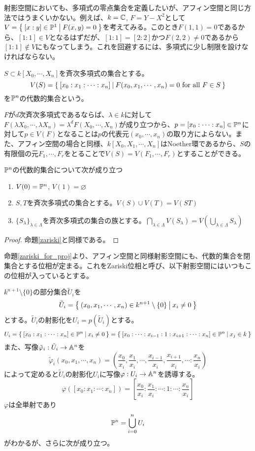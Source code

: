 \documentclass{ltjsreport}
\begin{document}
射影空間においても、多項式の零点集合を定義したいが、アフィン空間と同じ方法ではうまくいかない。例えば、$k=\mathbb{C}$, $F=Y-X^2$として$V=\left\{\:[x:y]\in\mathbb{P}^1\:\middle|\:F(x,y)=0\:\right\}$を考えてみる。このとき$F(1,1)=0$であるから、$[1:1]\in V$となるはずだが、$[1:1]=[2:2]$かつ$F(2,2)\neq 0$であるから$[1:1]\notin V$にもなってしまう。これを回避するには、多項式に少し制限を設けなければならない。

\begin{defin}
  $S\subset k[X_0,\cdots,X_n]$を斉次多項式の集合とする。
  \[
  V(S)=\left\{\:[x_0:x_1:\cdots:x_n]\:\middle|\:F(x_0,x_1,\cdots,x_n)=0\text{ for all }F\in S\:\right\}  
  \]
  を$\mathbb{P}^n$の代数的集合という。
\end{defin}

$F$が$d$次斉次多項式であるならば、$\lambda\in k$に対して$F(\lambda X_0,\cdots,\lambda X_n)=\lambda^dF(X_0,\cdots,X_n)$が成り立つから、$p=[x_0:\cdots:x_n]\in \mathbb{P}^n$に対して$p\in V(F)$となることは$p$の代表元$(x_0,\cdots,x_n)$の取り方によらない。また、アフィン空間の場合と同様、$k[X_0,X_1,\cdots,X_n]$はNoether環であるから、$S$の有限個の元$F_1,\cdots,F_r$をとることで$V(S)=V(F_1,\cdots,F_r)$とすることができる。

\begin{prop}\label{zariski_for_proj}
  $\mathbb{P}^n$の代数的集合について次が成り立つ
  \begin{enumerate}
    \item $V(0)=\mathbb{P}^n$, $V(1)=\varnothing$
    \item $S,T$を斉次多項式の集合とする。$V(S)\cup V(T)=V(ST)$
    \item $\{S_\lambda\}_{\lambda\in\Lambda}$を斉次多項式の集合の族とする。$\bigcap_{\lambda\in\Lambda}V(S_\lambda)=V(\bigcup_{\lambda\in\Lambda}S_\lambda)$
  \end{enumerate}
\end{prop}

\begin{proof}
  命題\ref{zariski}と同様である。
\end{proof}

命題\ref{zariski_for_proj}より、アフィン空間と同様射影空間にも、代数的集合を閉集合とする位相が定まる。これをZariski位相と呼び、以下射影空間にはいつもこの位相が入っているとする。

$k^{n+1}\setminus\{0\}$の部分集合$\tilde{U}_i$を
\[
\tilde{U}_i=\left\{\:(x_0,x_1,\cdots,x_n)\in k^{n+1}\setminus\{0\}\:\middle|\:x_i\neq 0\:\right\}  
\]
とする。$\tilde{U}_i$の射影化を$U_i=p(\tilde{U}_i)$とする。
\[
U_i=\left\{\:[x_0:x_1:\cdots:x_n]\in\mathbb{P}^n\:\middle|\:x_i\neq 0\:\right\}=\left\{\:[x_0:\cdots:x_{i-1}:1:x_{i+1}:\cdots:x_n]\in\mathbb{P}^n\:\middle|\:x_j\in k\:\right\} 
\]
また、写像$\tilde{\varphi}_i:\tilde{U}_i\rightarrow \mathbb{A}^n$を
\[
\tilde{\varphi}_i(x_0,x_1,\cdots,x_n)=(\frac{x_0}{x_i},\frac{x_1}{x_i},\cdots,\frac{x_{i-1}}{x_i},\frac{x_{i+1}}{x_i},\cdots:\frac{x_n}{x_i})
\]
によって定めると$\tilde{U}_i$の射影化$U_i$に写像$\varphi:U_i\rightarrow \mathbb{A}^n$を誘導する。
\[
\varphi([x_0:x_1:\cdots:x_n])=[\frac{x_0}{x_i}:\frac{x_1}{x_i}:\cdots:1:\cdots:\frac{x_n}{x_i}] 
\]
$\varphi$は全単射であり
\[
\mathbb{P}^n=\bigcup_{i=0}^nU_i  
\]
がわかるが、さらに次が成り立つ。
\end{document}
